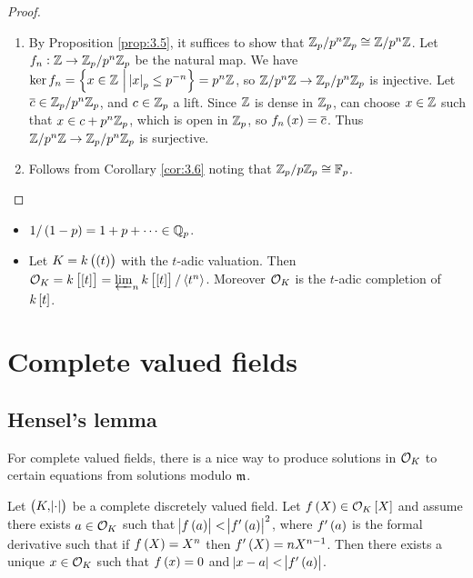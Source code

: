 \begin{proof}
\hfill
\begin{enumerate}
\item By Proposition \ref{prop:3.5}, it suffices to show that $ \mathbb{Z}_p / p^n\mathbb{Z}_p \cong \mathbb{Z} / p^n\mathbb{Z} $. Let $ f_n : \mathbb{Z} \to \mathbb{Z}_p / p^n\mathbb{Z}_p $ be the natural map. We have $ \ker f_n = \cbr{x \in \ZZ \st \abs{x}_p \le p^{-n}} = p^n\ZZ $, so $ \mathbb{Z} / p^n\mathbb{Z} \to \mathbb{Z}_p / p^n\mathbb{Z}_p $ is injective. Let $ \overline{c} \in \mathbb{Z}_p / p^n\mathbb{Z}_p $, and $ c \in \mathbb{Z}_p $ a lift. Since $ \mathbb{Z} $ is dense in $ \mathbb{Z}_p $, can choose $ x \in \mathbb{Z} $ such that $ x \in c + p^n\mathbb{Z}_p $, which is open in $ \mathbb{Z}_p $, so $ f_n\br{x} = \overline{c} $. Thus $ \mathbb{Z} / p^n\mathbb{Z} \to \mathbb{Z}_p / p^n\mathbb{Z}_p $ is surjective.
\item Follows from Corollary \ref{cor:3.6} noting that $ \mathbb{Z}_p / p\mathbb{Z}_p \cong \mathbb{F}_p $.
\end{enumerate}
\end{proof}

\begin{example*}
\hfill
\begin{itemize}
\item $ 1 / \br{1 - p} = 1 + p + \dots \in \QQ_p $.
\item Let $ K = k\br{\br{t}} $ with the $ t $-adic valuation. Then $ \OOO_K = k\sbr{\sbr{t}} = \varprojlim_n k\sbr{\sbr{t}} / \abr{t^n} $. Moreover $ \mathcal{O}_K $ is the $ t $-adic completion of $ k\sbr{t} $.
\end{itemize}
\end{example*}

\pagebreak

\section{Complete valued fields}

\subsection{Hensel's lemma}


For complete valued fields, there is a nice way to produce solutions in $ \mathcal{O}_K $ to certain equations from solutions modulo $ \mathfrak{m} $.

\begin{theorem}
\label{thm:4.1}
Let $ \br{K, \abs{\cdot}} $ be a complete discretely valued field. Let $ f\br{X} \in \OOO_K\sbr{X} $ and assume there exists $ a \in \mathcal{O}_K $ such that $ \abs{f\br{a}} < \abs{f'\br{a}}^2 $, where $ f'\br{a} $ is the formal derivative such that if $ f\br{X} = X^n $ then $ f'\br{X} = nX^{n - 1} $. Then there exists a unique $ x \in \mathcal{O}_K $ such that $ f\br{x} = 0 $ and $ \abs{x - a} < \abs{f'\br{a}} $.
\end{theorem}


